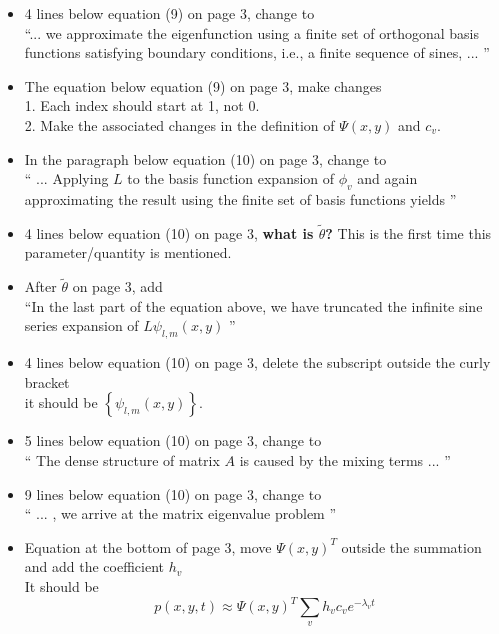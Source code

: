 \documentclass[12pt]{article}
\begin{document}
\begin{itemize}
\item 4 lines below equation (9) on page 3, change to \\
``... we approximate the eigenfunction using a finite set of orthogonal basis functions satisfying boundary conditions, i.e., a finite sequence of sines, ... ''

\item The equation below equation (9) on page 3, make changes \\
1. Each index should start at 1, not 0. \\ 
2. Make the associated changes in the definition of $\Psi(x, y)$ and $c_v$. 

\item In the paragraph below equation (10) on page 3, change to \\ 
`` ... Applying $L$ to the basis function expansion of $\phi_v $ and again approximating 
the result using the finite set of basis functions yields ''

\item 4 lines below equation (10) on page 3,  {\bf what is $\tilde{\theta} $?} 
This is the first time this parameter/quantity is mentioned.  

\item After $\tilde{\theta} $ on page 3, add \\
``In the last part of the equation above, we have truncated the infinite sine series 
expansion of $L \psi_{l, m}(x, y)$ '' 

\item 4 lines below equation (10) on page 3, delete the subscript outside the curly bracket \\
it should be $ \left\{ \psi_{l, m}(x, y) \right\} $. 

\item 5 lines below equation (10) on page 3, change to \\
`` The dense structure of matrix $A$ is caused by the mixing terms ... ''

\item 9 lines below equation (10) on page 3, change to \\
`` ... , we arrive at the matrix eigenvalue problem ''

\item Equation at the bottom of page 3, move $\Psi(x,y)^T $ outside the summation
and add the coefficient $h_v$ \\
It should be
$$ p(x,y,t) \approx \Psi(x,y)^T \sum_v h_v c_v e^{-\lambda_v t}  $$


\end{itemize}
\end{document}
